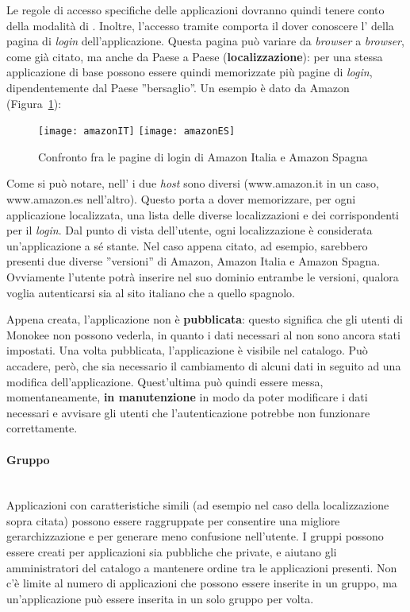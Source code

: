 Le regole di accesso specifiche delle applicazioni dovranno quindi tenere conto della modalità di . Inoltre, l'accesso tramite  comporta il dover conoscere l' della pagina di \textit{login} dell'applicazione. Questa pagina può variare da \textit{browser} a \textit{browser}, come già citato, ma anche da Paese a Paese (\textbf{localizzazione}): per una stessa applicazione di base possono essere quindi memorizzate più pagine di \textit{login}, dipendentemente dal Paese ''bersaglio''. Un esempio è dato da Amazon (Figura~\ref{fig:amazon}):
\begin{figure}[h]
\centering
\texttt{[image: amazonIT]}\hfill
\texttt{[image: amazonES]}
\caption[Confronto tra Amazon Italia e Spagna]{Confronto fra le pagine di login di Amazon Italia e Amazon Spagna}
\label{fig:amazon}
\end{figure}\newpage
Come si può notare, nell' i due \textit{host} sono diversi (www.amazon.it in un caso, www.amazon.es nell'altro). Questo porta a dover memorizzare, per ogni applicazione localizzata, una lista delle diverse localizzazioni e dei corrispondenti  per il \textit{login}. Dal punto di vista dell'utente, ogni localizzazione è considerata un'applicazione a sé stante. Nel caso appena citato, ad esempio, sarebbero presenti due diverse ''versioni'' di Amazon, Amazon Italia e Amazon Spagna. Ovviamente l'utente potrà inserire nel suo dominio entrambe le versioni, qualora voglia autenticarsi sia al sito italiano che a quello spagnolo.

Appena creata, l'applicazione non è \textbf{pubblicata}: questo significa che gli utenti di Monokee non possono vederla, in quanto i dati necessari al  non sono ancora stati impostati. Una volta pubblicata, l'applicazione è visibile nel catalogo. Può accadere, però, che sia necessario il cambiamento di alcuni dati in seguito ad una modifica dell'applicazione. Quest'ultima può quindi essere messa, momentaneamente, \textbf{in manutenzione} in modo da poter modificare i dati necessari e avvisare gli utenti che l'autenticazione potrebbe non funzionare correttamente.

\paragraph{Gruppo} \mbox{} \\
Applicazioni con caratteristiche simili (ad esempio nel caso della localizzazione sopra citata) possono essere raggruppate per consentire una migliore gerarchizzazione e per generare meno confusione nell'utente. I gruppi possono essere creati per applicazioni sia pubbliche che private, e aiutano gli amministratori del catalogo a mantenere ordine tra le applicazioni presenti. Non c'è limite al numero di applicazioni che possono essere inserite in un gruppo, ma un'applicazione può essere inserita in un solo gruppo per volta. 

